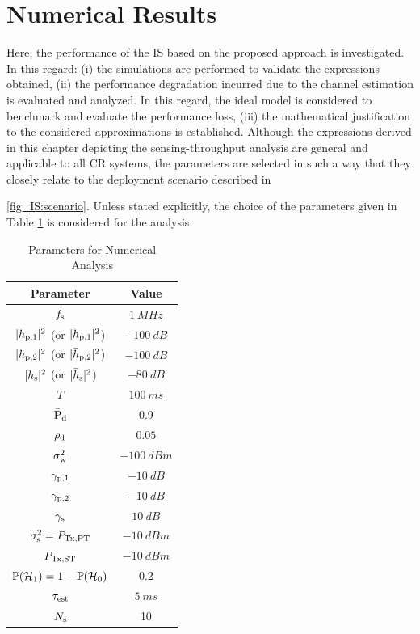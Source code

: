 \section{Numerical Results} \label{sec_IS:num_ana}
Here, the performance of the IS based on the proposed approach is investigated. In this regard: (i) the simulations are performed to validate the expressions obtained, (ii) the performance degradation incurred due to the channel estimation is evaluated and analyzed. In this regard, the ideal model is considered to benchmark and evaluate the performance loss, (iii) the mathematical justification to the considered approximations is established. Although the expressions derived in this chapter depicting the sensing-throughput analysis are general and applicable to all CR systems, the parameters are selected in such a way that they closely relate to the deployment scenario described in \figurename~{\ref{fig_IS:scenario}. Unless stated explicitly, the choice of the parameters given in Table \ref{tb_IS:tb2} is considered for the analysis. 
\begin{table}
\renewcommand{\arraystretch}{1.4}
\caption{Parameters for Numerical Analysis}
\label{tb_IS:tb2}
\centering
\begin{tabular}{c||c}
\hline
\bfseries Parameter & \bfseries Value \\
\hline\hline
$f_{\text{s}}$  & $\SI{1}{MHz}$ \\ %
$|h_{\text{p,1}}|^2$ (or $|\bar{h}_{\text{p,1}}|^2$)  & $\SI{-100}{dB}$ \\ %
$|h_{\text{p,2}}|^2$ (or $|\bar{h}_{\text{p,2}}|^2$) & $\SI{-100}{dB}$ \\ %
$|h_{\text{s}}|^2$ (or $|\bar{h}_{\text{s}}|^2$) & $\SI{-80}{dB}$ \\ %
$T$ & $\SI{100}{ms}$ \\ %
$\bar{\text{P}}_{\text{d}}$ & 0.9 \\ %
$\rho_{\text{d}}$ & $0.05$ \\ %
$\sigma^2_{\text{w}}$ & $\SI{-100}{dBm}$ \\ %
${\gamma}_{\text{p,1}}$ & $\SI{-10}{dB}$ \\ %
${\gamma}_{\text{p,2}}$ & $\SI{-10}{dB}$ \\ %
${\gamma}_{\text{s}}$ & $\SI{10}{dB}$ \\ %
$\sigma^2_{\text{s}} = P_{\text{Tx,PT}}$ & $-\SI{10}{dBm}$ \\ %
$P_{\text{Tx,ST}}$ & $-\SI{10}{dBm}$ \\ %
$\mathbb P(\mathcal{H}_1) = 1 - \mathbb P(\mathcal{H}_0)$ & 0.2 \\ %
$\tau_{\text{est}}$ & $\SI{5}{ms}$ \\ %
$N_{\text{s}}$ & 10 \\ \hline 
\end{tabular}
\end{table}
}
